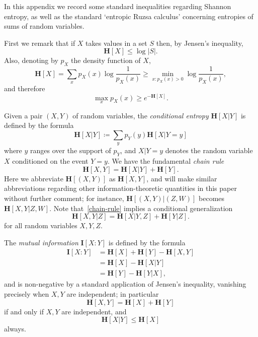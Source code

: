 \documentclass[12pt,reqno,tbtags]{amsart}
\theoremstyle{definition}
\theoremstyle{remark}
\renewcommand{\leq}{\leqslant}
\renewcommand{\geq}{\geqslant}
\newcommand{\ent}[1]{\mathbf{H}[#1]}
\newcommand{\I}[1]{\mathbf{I}[#1]}
\numberwithin{equation}{section}
\begin{document}
In this appendix we record some standard inequalities regarding Shannon entropy, as well as the standard `entropic Ruzsa calculus' concerning entropies of sums of random variables.

First we remark that if $X$ takes values in a set $S$ then, by Jensen's inequality,
\begin{equation}\label{convexity-bound} \ent{X} \leq \log |S|.\end{equation}
Also, denoting by $p_X$ the density function of $X$,
\[ \ent{X} = \sum_x p_X(x) \log \frac{1}{p_X(x)} \geq \min_{x : p_X(x)>0} \log \frac{1}{p_X(x)},\] and therefore
\begin{equation}\label{px-lower} \max_x p_X(x) \geq e^{-\ent{X}}.\end{equation}

Given a pair $(X,Y)$ of random variables, the \emph{conditional entropy} $\ent{X|Y}$ is defined by the formula
\[
  \ent{X|Y} \coloneqq \sum_y p_Y(y) \ent{X|Y=y}
\]
where $y$ ranges over the support of $p_Y$, and $X|Y=y$ denotes the random variable $X$ conditioned on the event $Y=y$.  We have the fundamental \emph{chain rule}
\begin{equation}
  \label{chain-rule}
  \ent{X,Y} = \ent{X|Y} + \ent{Y}.
\end{equation}
Here we abbreviate $\ent{(X,Y)}$ as $\ent{X,Y}$, and will make similar abbreviations regarding other information-theoretic quantities in this paper without further comment; for instance, $\ent{(X,Y)|(Z,W)}$ becomes $\ent{X,Y|Z,W}$.  Note that~\eqref{chain-rule} implies a conditional generalization
\[
  \ent{X,Y|Z} = \ent{X|Y,Z} + \ent{Y|Z}.
\]
for all random variables $X,Y,Z$.

The \emph{mutual information} $\I{X:Y}$ is defined by the formula
\[
  \begin{split}
    \I{X:Y} &= \ent{X} + \ent{Y} - \ent{X,Y} \\
            &= \ent{X} - \ent{X|Y} \\
            &= \ent{Y} - \ent{Y|X},
  \end{split}
\]
and is non-negative by a standard application of Jensen's inequality, vanishing precisely when $X,Y$ are independent; in particular
\begin{equation}
\label{indep}
  \ent{X,Y} = \ent{X} + \ent{Y}
\end{equation}
if and only if $X,Y$ are independent, and
\begin{equation}\label{cond-dec} \ent{X | Y} \leq \ent{X}\end{equation} always.
\end{document}
